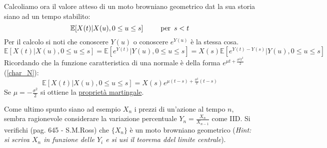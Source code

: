 Calcoliamo ora il valore atteso di un moto browniano geometrico dat la sua storia siano ad un tempo stabilito:
\[\mathbb{E}[X(t)|X(u), 0\leq u\leq s] \hspace{25px} \text{per} \hspace{5px} s<t\]
Per il calcolo si noti che conoscere $Y(u)$ o conoscere $e^{Y(u)}$ è la stessa cosa.
\[\mathbb{E}[X(t)|X(u), 0\leq u\leq s]=\mathbb{E}[e^{Y(t)}|Y(u), 0\leq u\leq s]=X(s)\mathbb{E}[e^{Y(t)-Y(s)}|Y(u), 0\leq u\leq s]\]
Ricordando che la funzione caratteristica di una normale è della forma $e^{\mu t+\frac{\sigma^2t^2}{2}}$ (\ref{char_N}):
\[\mathbb{E}[X(t)|X(u), 0\leq u\leq s]=X(s)e^{\mu(t-s)+\frac{\sigma^2}{2}(t-s)}\]
Se $\mu=-\frac{\sigma^2}{2}$ si ottiene la \href{https://en.wikipedia.org/wiki/Martingale_(probability_theory)}{proprietà martingale}.

Come ultimo spunto siano ad esempio $X_n$ i prezzi di un'azione al tempo $n$, sembra ragionevole considerare la variazione percentuale $Y_n=\frac{X_n}{X_{n-1}}$ come IID. Si verifichi (pag. 645 - S.M.Ross) che $\{X_n\}$ è un moto browniano geometrico (\textit{Hint: si scriva $X_n$ in funzione delle $Y_i$ e si usi il teorema ddel limite centrale}).